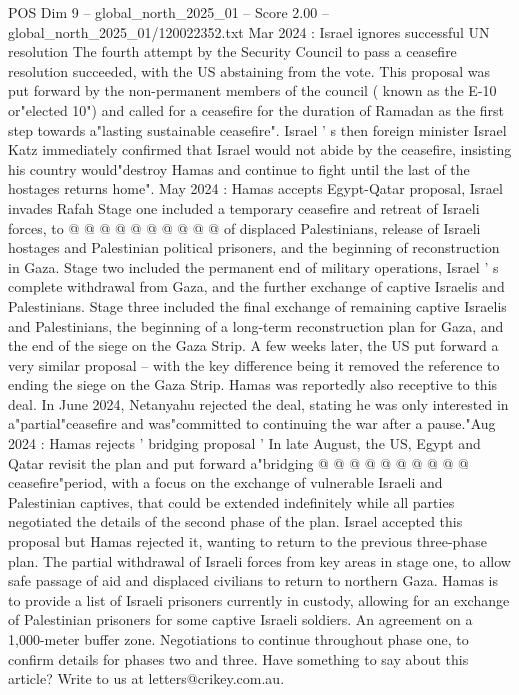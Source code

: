 \begin{textsample}{POS Dim 9 – global\_north\_2025\_01 – Score 2.00 – global\_north\_2025\_01/120022352.txt}
Mar 2024 : Israel ignores successful UN resolution The fourth attempt by the Security Council to pass a ceasefire resolution succeeded, with the US abstaining from the vote.
This proposal was put forward by the non-permanent members of the council ( known as the E-10 or"elected 10") and called for a ceasefire for the duration of Ramadan as the first step towards a"lasting sustainable ceasefire".
Israel ' s then foreign minister Israel Katz immediately confirmed that Israel would not abide by the ceasefire, insisting his country would"destroy Hamas and continue to fight until the last of the hostages returns home".
May 2024 : Hamas accepts Egypt-Qatar proposal, Israel invades Rafah Stage one included a temporary ceasefire and retreat of Israeli forces, to @ @ @ @ @ @ @ @ @ @ of displaced Palestinians, release of Israeli hostages and Palestinian political prisoners, and the beginning of reconstruction in Gaza.
Stage two included the permanent end of military operations, Israel ' s complete withdrawal from Gaza, and the further exchange of captive Israelis and Palestinians.
Stage three included the final exchange of remaining captive Israelis and Palestinians, the beginning of a long-term reconstruction plan for Gaza, and the end of the siege on the Gaza Strip.
A few weeks later, the US put forward a very similar proposal -- with the key difference being it removed the reference to ending the siege on the Gaza Strip.
Hamas was reportedly also receptive to this deal.
In June 2024, Netanyahu rejected the deal, stating he was only interested in a"partial"ceasefire and was"committed to continuing the war after a pause."Aug 2024 : Hamas rejects ' bridging proposal ' In late August, the US, Egypt and Qatar revisit the plan and put forward a"bridging @ @ @ @ @ @ @ @ @ @ ceasefire"period, with a focus on the exchange of vulnerable Israeli and Palestinian captives, that could be extended indefinitely while all parties negotiated the details of the second phase of the plan.
Israel accepted this proposal but Hamas rejected it, wanting to return to the previous three-phase plan.
The partial withdrawal of Israeli forces from key areas in stage one, to allow safe passage of aid and displaced civilians to return to northern Gaza.
Hamas is to provide a list of Israeli prisoners currently in custody, allowing for an exchange of Palestinian prisoners for some captive Israeli soldiers.
An agreement on a 1,000-meter buffer zone.
Negotiations to continue throughout phase one, to confirm details for phases two and three.
Have something to say about this article?
Write to us at letters@crikey.com.au.

\end{textsample}
